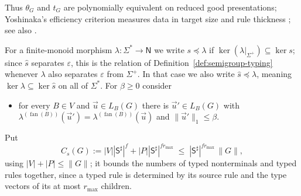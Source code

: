 \documentclass[11pt]{article}
\numberwithin{equation}{section}
\theoremstyle{plain}
\theoremstyle{definition}
\theoremstyle{remark}
\newcommand{\tuple}[1]{\vec{#1}}
\newcommand{\eps}{\varepsilon}
\newcommand{\fan}{\operatorname{fan}}
\theoremstyle{plain}
\begin{document}
Thus $\theta_G$ and $t_G$ are polynomially equivalent on reduced good
presentations; Yoshinaka's efficiency criterion measures data in target size and
rule thickness \cite[Definition~1]{Yoshinaka2011}; see also
\cite{EyraudHeinzYoshinaka2016}.

For a finite-monoid morphism $\lambda:\Sigma^*\to\mathsf N$ we write $s\preceq\lambda$
if $\ker(\lambda|_{\Sigma^+})\subseteq\ker s$; since $\widehat s$ separates $\eps$,
this is the relation of Definition~\ref{def:semigroup-typing} whenever $\lambda$
also separates $\eps$ from $\Sigma^+$.  In that case we also write
$\widehat s\preceq\lambda$, meaning
$\ker\lambda\subseteq\ker\widehat s$ on all of $\Sigma^*$.
For $\beta\ge0$ consider
\begin{itemize}[leftmargin=4em]
\item[$(\mathrm R_\beta^\lambda)$] for every $B\in V$ and $\tuple u\in L_B(G)$
there is $\tuple u'\in L_B(G)$ with
$\lambda^{(\fan(B))}(\tuple u')=\lambda^{(\fan(B))}(\tuple u)$ and
$\|\tuple u'\|_1\le\beta$.
\end{itemize}
Put
\[
 C_s(G):=|V||\mathsf S^\sharp|^f+|P||\mathsf S^\sharp|^{fr_{\max}}
 \;\le\;|\mathsf S^\sharp|^{fr_{\max}}\,\|G\|,
\]
using $|V|+|P|\le\|G\|$; it bounds the numbers of typed nonterminals and typed
rules together, since a typed rule is determined by its source rule and the type
vectors of its at most $r_{\max}$ children.
\end{document}

